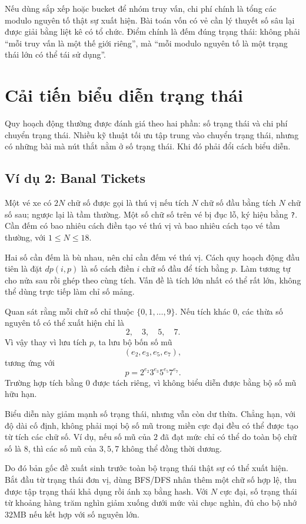 \documentclass[11pt]{article}
\begin{document}
Nếu dùng sắp xếp hoặc bucket để nhóm truy vấn, chi phí chính là tổng các
modulo nguyên tố thật sự xuất hiện. Bài toán vốn có vẻ cần lý thuyết số sâu
lại được giải bằng liệt kê có tổ chức. Điểm chính là đếm đúng trạng thái:
không phải ``mỗi truy vấn là một thế giới riêng'', mà ``mỗi modulo nguyên tố là
một trạng thái lớn có thể tái sử dụng''.

\section{Cải tiến biểu diễn trạng thái}

Quy hoạch động thường được đánh giá theo hai phần: số trạng thái và chi phí
chuyển trạng thái. Nhiều kỹ thuật tối ưu tập trung vào chuyển trạng thái, nhưng
có những bài mà nút thắt nằm ở số trạng thái. Khi đó phải đổi cách biểu diễn.

\subsection{Ví dụ 2: Banal Tickets}

Một vé xe có \(2N\) chữ số được gọi là thú vị nếu tích \(N\) chữ số đầu bằng
tích \(N\) chữ số sau; ngược lại là tầm thường. Một số chữ số trên vé bị đục
lỗ, ký hiệu bằng \texttt{?}. Cần đếm có bao nhiêu cách điền tạo vé thú vị và
bao nhiêu cách tạo vé tầm thường, với \(1\le N\le 18\).

Hai số cần đếm là bù nhau, nên chỉ cần đếm vé thú vị. Cách quy hoạch động đầu
tiên là đặt \(dp(i,p)\) là số cách điền \(i\) chữ số đầu để tích bằng \(p\).
Làm tương tự cho nửa sau rồi ghép theo cùng tích. Vấn đề là tích lớn nhất có
thể rất lớn, không thể dùng trực tiếp làm chỉ số mảng.

Quan sát rằng mỗi chữ số chỉ thuộc \(\{0,1,\ldots,9\}\). Nếu tích khác \(0\),
các thừa số nguyên tố có thể xuất hiện chỉ là
\[
  2,\quad 3,\quad 5,\quad 7.
\]
Vì vậy thay vì lưu tích \(p\), ta lưu bộ bốn số mũ
\[
  (e_2,e_3,e_5,e_7),
\]
tương ứng với
\[
  p=2^{e_2}3^{e_3}5^{e_5}7^{e_7}.
\]
Trường hợp tích bằng \(0\) được tách riêng, vì không biểu diễn được bằng bộ số
mũ hữu hạn.

Biểu diễn này giảm mạnh số trạng thái, nhưng vẫn còn dư thừa. Chẳng hạn, với
độ dài cố định, không phải mọi bộ số mũ trong miền cực đại đều có thể được tạo
từ tích các chữ số. Ví dụ, nếu số mũ của \(2\) đã đạt mức chỉ có thể do toàn
bộ chữ số là \(8\), thì các số mũ của \(3,5,7\) không thể đồng thời dương.

Do đó bản gốc đề xuất sinh trước toàn bộ trạng thái thật sự có thể xuất hiện.
Bắt đầu từ trạng thái đơn vị, dùng BFS/DFS nhân thêm một chữ số hợp lệ, thu
được tập trạng thái khả dụng rồi ánh xạ bằng hash. Với \(N\) cực đại, số trạng
thái từ khoảng hàng trăm nghìn giảm xuống dưới mức vài chục nghìn, đủ cho bộ
nhớ 32MB nếu kết hợp với số nguyên lớn.
\end{document}
